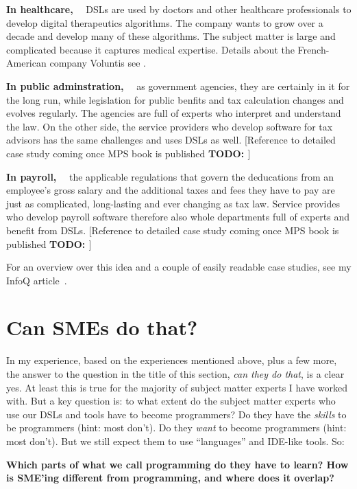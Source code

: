 \documentclass[runningheads]{llncs}
\newcommand\parhead[1]{\vspace{1mm}\noindent\textbf{{#1}}\ \ }
\newcommand\todo[1]{\vspace{1mm}\noindent\textbf{\color{red} {{TODO: {#1}} }}}
\begin{document}
\parhead{In healthcare,} DSLs are used by doctors and other healthcare
professionals to develop digital therapeutics algorithms. The company wants to
grow over a decade and develop many of these algorithms. The subject matter is
large and complicated because it captures medical expertise. Details about
the French-American company Voluntis see \cite{voelter2019vol}.

\parhead{In public adminstration,} as government agencies, they are certainly in
it for the long run, while legislation for public benfits and tax calculation
changes and evolves regularly. The agencies are full of experts who interpret
and understand the law. On the other side, the service providers who develop
software for tax advisors has the same challenges and uses DSLs as well.
[Reference to detailed case study coming once MPS book is published\todo{}]

\parhead{In payroll,} the applicable regulations that govern the  
deducations from an employee's gross salary and the additional taxes and fees
they have to pay are just as complicated, long-lasting and ever changing as tax
law. Service provides who develop payroll software therefore also whole 
departments full of experts and benefit from DSLs. 
[Reference to detailed case study coming once MPS book is published\todo{}]

\vspace{3mm}

\noindent For an overview over this idea and a couple of easily readable 
case studies, see my InfoQ article~\cite{infoq}.

\section{Can SMEs do that?}

In my experience, based on the experiences mentioned above, plus a few more, the
answer to the question in the title of this section, \emph{can they do that}, is
a clear yes. At least this is true for the majority of subject matter experts I
have worked with. But a key question is: to what extent do the subject matter
experts who use our DSLs and tools have to become programmers? Do they have the
\emph{skills} to be programmers (hint: most don't). Do they \emph{want} to
become programmers (hint: most don't). But we still expect them to use
``languages'' and IDE-like tools. So:

\vspace{2mm}
\noindent \textbf{Which parts of what we call programming do they have to learn?
How is SME'ing different from programming, and where does it overlap?}
\vspace{2mm}
\end{document}
